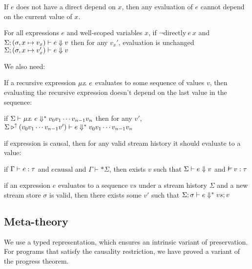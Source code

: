 \documentclass[sigplan,screen]{acmart}
\begin{document}
\begin{lemma}
If $e$ does not have a direct depend on $x$, then any evaluation of $e$ cannot depend on the current value of $x$.
  
For all expressions $e$ and well-scoped variables $x$,
if $\neg \mbox{directly} ~e~ x$ and
$\Sigma; (\sigma, x \mapsto v_x) \vdash e \Downarrow v$
then for any $v_x'$, evaluation is unchanged
$\Sigma; (\sigma, x \mapsto v_x') \vdash e \Downarrow v$
\end{lemma}

We also need:
\begin{lemma}
  If a recursive expression $\mu{} x \!.~e$ evaluates to some sequence of values $v$, then evaluating the recursive expression doesn't depend on the last value in the sequence:

  if $\Sigma \vdash \mu{} x \!.~e \Downarrow^{*} v_0 v_1 \cdots v_{n-1} v_n $
  then for any $v'$,
  $\Sigma \triangleright^{\uparrow} (v_0 v_1 \cdots v_{n-1} v') \vdash e \Downarrow^{*} v_0 v_1 \cdots v_{n-1} v_n$
\end{lemma}


\begin{lemma}[progress]
  if expression is causal, then for any valid stream history it should evaluate to a value:

  if $\Gamma \vdash e : \tau$ and $e \mbox{causal}$ and $\Gamma \vdash* \Sigma$, then exists $v$ such that
  $\Sigma \vdash e \Downarrow v$ and $\mtyping{}{v}{\tau}$
\end{lemma}

\begin{lemma}
  if an expression $e$ evaluates to a sequence $vs$ under a stream history $\Sigma$ and a new stream store $\sigma$ is valid, then
  there exists some $v'$ such that
  $\Sigma; \sigma \vdash e \Downarrow^{*} vs; v$
\end{lemma}

\subsection{Meta-theory}
\label{ss:meta-theory}

We use a typed representation, which ensures an intrinsic variant of preservation.
For programs that satisfy the causality restriction, we have proved a variant of the progress theorem.
\end{document}
